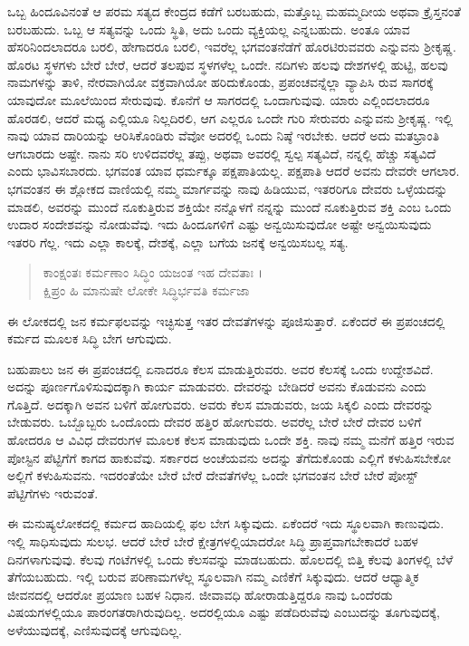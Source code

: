 ಒಬ್ಬ ಹಿಂದೂವಿನಂತೆ ಆ ಪರಮ ಸತ್ಯದ ಕೇಂದ್ರದ ಕಡೆಗೆ ಬರಬಹುದು, ಮತ್ತೊಬ್ಬ ಮಹಮ್ಮದೀಯ ಅಥವಾ ಕ್ರೈಸ್ತನಂತೆ ಬರಬಹುದು. ಒಬ್ಬ ಆ ಸತ್ಯವನ್ನು ಒಂದು ಸ್ಥಿತಿ, ಅದು ಒಂದು ವ್ಯಕ್ತಿಯಲ್ಲ ಎನ್ನಬಹುದು. ಅಂತೂ ಯಾವ ಹೆಸರಿನಿಂದಲಾದರೂ ಬರಲಿ, ಹೇಗಾದರೂ ಬರಲಿ, ಇವರೆಲ್ಲ ಭಗವಂತನೆಡೆಗೆ ಹೊರಟಿರುವವರು ಎನ್ನುವನು ಶ್ರೀಕೃಷ್ಣ. ಹೊರಟ ಸ್ಥಳಗಳು ಬೇರೆ ಬೇರೆ, ಆದರೆ ತಲಪುವ ಸ್ಥಳಗಳೆಲ್ಲ ಒಂದೇ. ನದಿಗಳು ಹಲವು ದೇಶಗಳಲ್ಲಿ ಹುಟ್ಟಿ, ಹಲವು ನಾಮಗಳನ್ನು ತಾಳಿ, ನೇರವಾಗಿಯೋ ವಕ್ರವಾಗಿಯೋ ಹರಿದುಕೊಂಡು, ಪ್ರಪಂಚವನ್ನೆಲ್ಲಾ ವ್ಯಾಪಿಸಿ ರುವ ಸಾಗರಕ್ಕೆ ಯಾವುದೋ ಮೂಲೆಯಿಂದ ಸೇರುವುವು. ಕೊನೆಗೆ ಆ ಸಾಗರದಲ್ಲಿ ಒಂದಾಗುವುವು. ಯಾರು ಎಲ್ಲಿಂದಲಾದರೂ ಹೊರಡಲಿ, ಆದರೆ ಮಧ್ಯ ಎಲ್ಲಿಯೂ ನಿಲ್ಲದಿರಲಿ, ಆಗ ಎಲ್ಲರೂ ಒಂದೇ ಗುರಿ ಸೇರುವರು ಎನ್ನುವನು ಶ್ರೀಕೃಷ್ಣ. ಇಲ್ಲಿ ನಾವು ಯಾವ ದಾರಿಯನ್ನು ಆರಿಸಿಕೊಂಡಿರು ವೆವೋ ಅದರಲ್ಲಿ ಒಂದು ನಿಷ್ಠೆ ಇರಬೇಕು. ಆದರೆ ಅದು ಮತಭ್ರಾಂತಿ ಆಗಬಾರದು ಅಷ್ಟೇ. ನಾನು ಸರಿ ಉಳಿದವರೆಲ್ಲ ತಪ್ಪು, ಅಥವಾ ಅವರಲ್ಲಿ ಸ್ವಲ್ಪ ಸತ್ಯವಿದೆ, ನನ್ನಲ್ಲಿ ಹೆಚ್ಚು ಸತ್ಯವಿದೆ ಎಂದು ಭಾವಿಸಬಾರದು. ಭಗವಂತ ಯಾವ ಧರ್ಮಕ್ಕೂ ಪಕ್ಷಪಾತಿಯಲ್ಲ. ಪಕ್ಷಪಾತಿ ಆದರೆ ಅವನು ದೇವರೇ ಆಗಲಾರ. ಭಗವಂತನ ಈ ಶ್ಲೋಕದ ವಾಣಿಯಲ್ಲಿ ನಮ್ಮ ಮಾರ್ಗವನ್ನು ನಾವು ಹಿಡಿಯುವ, ಇತರರಿಗೂ ದೇವರು ಒಳ್ಳೆಯದನ್ನು ಮಾಡಲಿ, ಅವರನ್ನು ಮುಂದೆ ನೂಕುತ್ತಿರುವ ಶಕ್ತಿಯೇ ನನ್ನೊಳಗೆ ನನ್ನನ್ನು ಮುಂದೆ ನೂಕುತ್ತಿರುವ ಶಕ್ತಿ ಎಂಬ ಒಂದು ಉದಾರ ಸಂದೇಶವನ್ನು ನೋಡುವೆವು. ಇದು ಹಿಂದೂಗಳಿಗೆ ಎಷ್ಟು ಅನ್ವಯಿಸುವುದೋ ಅಷ್ಟೇ ಅನ್ವಯಿಸುವುದು ಇತರರಿ ಗೆಲ್ಲ. ಇದು ಎಲ್ಲಾ ಕಾಲಕ್ಕೆ, ದೇಶಕ್ಕೆ, ಎಲ್ಲಾ ಬಗೆಯ ಜನಕ್ಕೆ ಅನ್ವಯಿಸಬಲ್ಲ ಸತ್ಯ.

\begin{verse}
ಕಾಂಕ್ಷಂತಃ ಕರ್ಮಣಾಂ ಸಿದ್ಧಿಂ ಯಜಂತ ಇಹ ದೇವತಾಃ ।\\ಕ್ಷಿಪ್ರಂ ಹಿ ಮಾನುಷೇ ಲೋಕೇ ಸಿದ್ಧಿರ್ಭವತಿ ಕರ್ಮಜಾ 
\end{verse}

{\small ಈ ಲೋಕದಲ್ಲಿ ಜನ ಕರ್ಮಫಲವನ್ನು ಇಚ್ಛಿಸುತ್ತ ಇತರ ದೇವತೆಗಳನ್ನು ಪೂಜಿಸುತ್ತಾರೆ. ಏಕೆಂದರೆ ಈ ಪ್ರಪಂಚದಲ್ಲಿ ಕರ್ಮದ ಮೂಲಕ ಸಿದ್ಧಿ ಬೇಗ ಆಗುವುದು.}

ಬಹುಪಾಲು ಜನ ಈ ಪ್ರಪಂಚದಲ್ಲಿ ಏನಾದರೂ ಕೆಲಸ ಮಾಡುತ್ತಿರುವರು. ಅವರ ಕೆಲಸಕ್ಕೆ ಒಂದು ಉದ್ದೇಶವಿದೆ. ಅದನ್ನು ಪೂರ್ಣಗೊಳಿಸುವುದಕ್ಕಾಗಿ ಕಾರ್ಯ ಮಾಡುವರು. ದೇವರನ್ನು ಬೇಡಿದರೆ ಅವನು ಕೊಡುವನು ಎಂದು ಗೊತ್ತಿದೆ. ಅದಕ್ಕಾಗಿ ಅವನ ಬಳಿಗೆ ಹೋಗುವರು. ಅವರು ಕೆಲಸ ಮಾಡುವರು, ಜಯ ಸಿಕ್ಕಲಿ ಎಂದು ದೇವರನ್ನು ಬೇಡುವರು. ಒಬ್ಬೊಬ್ಬರು ಒಂದೊಂದು ದೇವರ ಹತ್ತಿರ ಹೋಗುವರು. ಅವರೆಲ್ಲ ಬೇರೆ ಬೇರೆ ದೇವರ ಬಳಿಗೆ ಹೋದರೂ ಆ ವಿವಿಧ ದೇವರುಗಳ ಮೂಲಕ ಕೆಲಸ ಮಾಡುವುದು ಒಂದೇ ಶಕ್ತಿ. ನಾವು ನಮ್ಮ ಮನೆಗೆ ಹತ್ತಿರ ಇರುವ ಪೋಸ್ಟಿನ ಪೆಟ್ಟಿಗೆಗೆ ಕಾಗದ ಹಾಕುವೆವು. ಸರ್ಕಾರದ ಅಂಚೆಯವನು ಅದನ್ನು ತೆಗೆದುಕೊಂಡು ಎಲ್ಲಿಗೆ ಕಳುಹಿಸಬೇಕೋ ಅಲ್ಲಿಗೆ ಕಳುಹಿಸುವನು. ಇದರಂತೆಯೇ ಬೇರೆ ಬೇರೆ ದೇವತೆಗಳೆಲ್ಲ ಒಂದೇ ಭಗವಂತನ ಬೇರೆ ಬೇರೆ ಪೋಸ್ಟ್ ಪೆಟ್ಟಿಗೆಗಳು ಇರುವಂತೆ.

ಈ ಮನುಷ್ಯಲೋಕದಲ್ಲಿ ಕರ್ಮದ ಹಾದಿಯಲ್ಲಿ ಫಲ ಬೇಗ ಸಿಕ್ಕುವುದು. ಏಕೆಂದರೆ ಇದು ಸ್ಥೂಲವಾಗಿ ಕಾಣುವುದು. ಇಲ್ಲಿ ಸಾಧಿಸುವುದು ಸುಲಭ. ಆದರೆ ಬೇರೆ ಬೇರೆ ಕ್ಷೇತ್ರಗಳಲ್ಲಿಯಾದರೋ ಸಿದ್ಧಿ ಪ್ರಾಪ್ತವಾಗಬೇಕಾದರೆ ಬಹಳ ದಿನಗಳಾಗುವುವು. ಕೆಲವು ಗಂಟೆಗಳಲ್ಲಿ ಒಂದು ಕೆಲಸವನ್ನು ಮಾಡಬಹುದು. ಹೊಲದಲ್ಲಿ ಬಿತ್ತಿ ಕೆಲವು ತಿಂಗಳಲ್ಲಿ ಬೆಳೆ ತೆಗೆಯಬಹುದು. ಇಲ್ಲಿ ಬರುವ ಪರಿಣಾಮಗಳೆಲ್ಲ ಸ್ಥೂಲವಾಗಿ ನಮ್ಮ ಎಣಿಕೆಗೆ ಸಿಕ್ಕುವುದು. ಆದರೆ ಆಧ್ಯಾತ್ಮಿಕ ಜೀವನದಲ್ಲಿ ಆದರೋ ಪ್ರಯಾಣ ಬಹಳ ನಿಧಾನ. ಜೀವಾವಧಿ ಹೋರಾಡುತ್ತಿದ್ದರೂ ನಾವು ಒಂದೆರಡು ವಿಷಯಗಳಲ್ಲಿಯೂ ಪಾರಂಗತರಾಗಿರುವುದಿಲ್ಲ. ಅದರಲ್ಲಿಯೂ ಎಷ್ಟು ಪಡೆದಿರುವೆವು ಎಂಬುದನ್ನು ತೂಗುವುದಕ್ಕೆ, ಅಳೆಯುವುದಕ್ಕೆ, ಎಣಿಸುವುದಕ್ಕೆ ಆಗುವುದಿಲ್ಲ.

